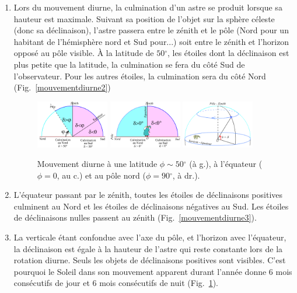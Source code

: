\documentclass[a4paper,10pt]{report}
\renewcommand{\deg}{\ensuremath{^{\circ}}}
\begin{document}
\begin{Answer}
  \begin{enumerate}
  \item Lors du mouvement diurne, la culmination d'un astre se produit
    lorsque sa hauteur est maximale.  Suivant sa position de l'objet
    sur la sphère céleste (donc sa déclinaison), l'astre passera entre
    le zénith et le pôle (Nord pour un habitant de l'hémisphère nord
    et Sud pour...) soit entre le zénith et l'horizon opposé au pôle
    visible. À la latitude de $50\deg$, les étoiles dont la
    déclinaison est plus petite que la latitude, la culmination se
    fera du côté Sud de l'observateur.  Pour les autres étoiles, la
    culmination sera du côté Nord (Fig.~\ref{mouvementdiurne2})

    \begin{figure}[htp]
      \centering
      \includegraphics[width=0.3\textwidth]{mouvement_diurne2}
      \includegraphics[width=0.3\textwidth]{mouvement_diurne3}
      \includegraphics[width=0.3\textwidth]{mouvement_diurne4}
      \label{mouvementdiurne2}
      \label{mouvementdiurne3}
      \label{mouvementdiurne4}
      \caption{Mouvement diurne à une latitude $\phi\sim 50\deg$
        (à g.), à l'équateur ($\phi = 0$, au c.) et au pôle nord
        ($\phi = 90\deg$, à dr.).}
    \end{figure}

  \item L'équateur passant par le zénith, toutes les étoiles de
    déclinaisons positives culminent au Nord et les étoiles de
    déclinaisons négatives au Sud. Les étoiles de déclinaisons nulles
    passent au zénith (Fig.~\ref{mouvementdiurne3}).

  \item La verticale étant confondue avec l'axe du pôle, et l'horizon
    avec l'équateur, la déclinaison est égale à la hauteur de l'astre
    qui reste constante lors de la rotation diurne.  Seuls les objets
    de déclinaisons positives sont visibles. C'est pourquoi le Soleil
    dans son mouvement apparent durant l'année donne 6 mois
    consécutifs de jour et 6 mois consécutifs de nuit
    (Fig.~\ref{mouvementdiurne4}).
  \end{enumerate}
\end{Answer}
\end{document}
